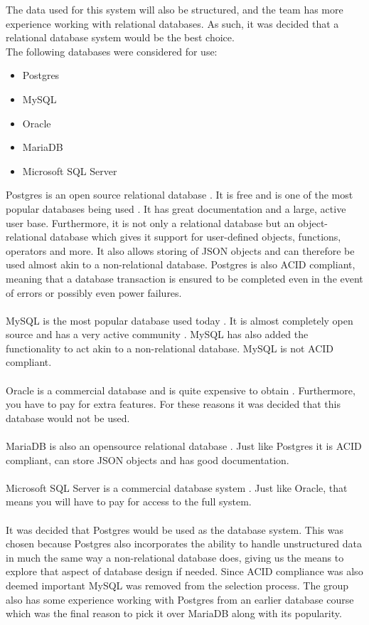 The data used for this system will also be structured, and the team has more experience working with relational databases.
As such, it was decided that a relational database system would be the best choice.
\\
The following databases were considered for use:
\begin{itemize}
    \item Postgres
    \item MySQL
    \item Oracle
    \item MariaDB
    \item Microsoft SQL Server
\end{itemize}
Postgres is an open source relational database \cite{Postgres}.
It is free and is one of the most popular databases being used \cite{databasePopularity}.
It has great documentation and a large, active user base.
Furthermore, it is not only a relational database but an object-relational database which gives it support for user-defined objects, functions, operators and more.
It also allows storing of JSON objects and can therefore be used almost akin to a non-relational database.
Postgres is also ACID compliant, meaning that a database transaction is ensured to be completed even in the event of errors or possibly even power failures.
\\
\\
MySQL is the most popular database used today \cite{databasePopularity}.
It is almost completely open source and has a very active community \cite{MySQL}.
MySQL has also added the functionality to act akin to a non-relational database.
MySQL is not ACID compliant.
\\
\\
Oracle is a commercial database and is quite expensive to obtain \cite{oracle}.
Furthermore, you have to pay for extra features.
For these reasons it was decided that this database would not be used.
\\
\\
MariaDB is also an opensource relational database \cite{MariaDB}.
Just like Postgres it is ACID compliant, can store JSON objects and has good documentation.
\\
\\
Microsoft SQL Server is a commercial database system \cite{MSSQLSERVER}.
Just like Oracle, that means you will have to pay for access to the full system.
\\
\\
It was decided that Postgres would be used as the database system.
This was chosen because Postgres also incorporates the ability to handle unstructured data in much the same way a non-relational database does, giving us the means to explore that aspect of database design if needed.
Since ACID compliance was also deemed important MySQL was removed from the selection process. 
The group also has some experience working with Postgres from an earlier database course which was the final reason to pick it over MariaDB along with its popularity.
